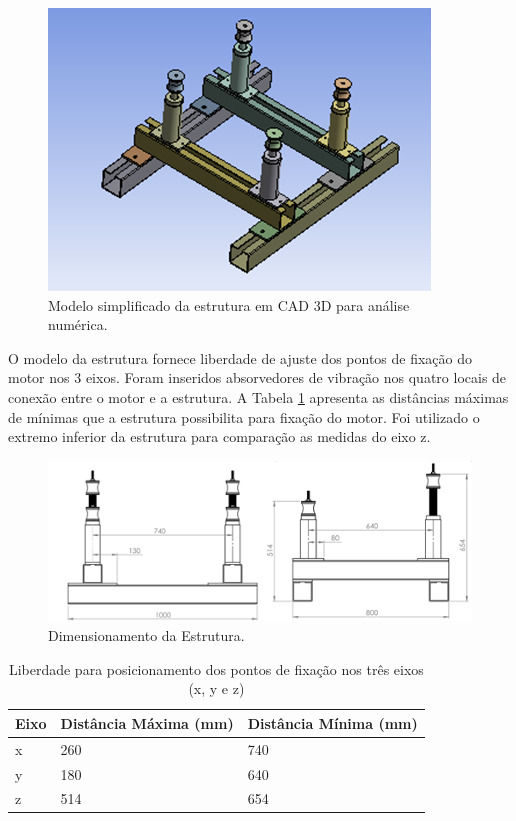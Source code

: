 \begin{figure}[h!]
	\centering
	\includegraphics[keepaspectratio=true,scale= 0.8]{figuras/estrutura-3D.png}
	\caption{Modelo simplificado da estrutura em CAD 3D para análise numérica.}
	\label{fig:estrutura3D}
\end{figure}

O modelo da estrutura fornece liberdade de ajuste dos pontos de fixação do motor nos 3 eixos. Foram inseridos absorvedores de vibração nos quatro locais de conexão entre o motor e a estrutura. A Tabela \ref{tab:pontosfixacao} apresenta as distâncias máximas de mínimas que a estrutura possibilita para fixação do motor. Foi utilizado o extremo inferior da estrutura para comparação as medidas do eixo z.

\begin{figure}[h!]
	\centering
	\includegraphics[keepaspectratio=true,scale= 0.8]{figuras/dimensionamento.png}
	\caption{Dimensionamento da Estrutura.}
	\label{fig:dimensionamento}
\end{figure}


\begin{table}[!h]
\centering
\caption{Liberdade para posicionamento dos pontos de fixação nos três eixos (x, y e z)}
\label{tab:pontosfixacao}
\begin{tabular}{|l|l|l|}
\hline
\multicolumn{1}{|c|}{\textbf{Eixo}}    & \multicolumn{1}{c|}{\textbf{Distância Máxima (mm)}} & \multicolumn{1}{c|}{\textbf{Distância Mínima (mm)}} \\ \hline
x        					   & 260                             & 740                \\ \hline
y       					   & 180                              & 640               \\ \hline
z             				   & 514                              & 654            \\ \hline
\end{tabular}
\end{table}


